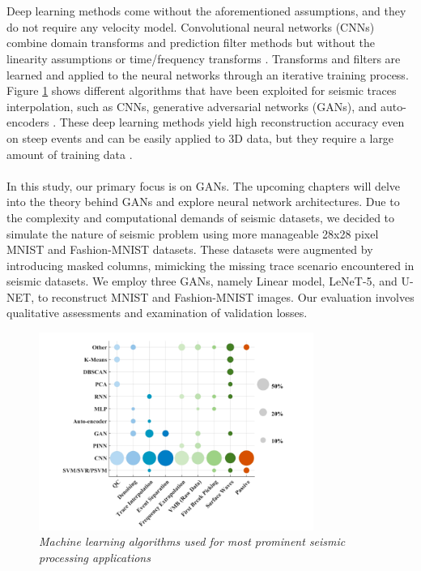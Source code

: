 \\\\
Deep learning methods come without the aforementioned assumptions, and they do not require any velocity model. Convolutional neural networks (CNNs) combine domain transforms and prediction filter methods but without the linearity assumptions or time/frequency transforms \cite{oliveira2018interpolating}. Transforms and filters are learned and applied to the neural networks through an iterative training process. Figure \ref{fig:methods} shows different algorithms that have been exploited for seismic traces interpolation, such as CNNs, generative adversarial networks (GANs), and auto-encoders \cite{khosro2023machine}. These deep learning methods yield high reconstruction accuracy even on steep events and can be easily applied to 3D data, but they require a large amount of training data \cite{kaur2019seismic, kaur2021seismic, khosro2023machine}.
\\\\
In this study, our primary focus is on GANs. The upcoming chapters will delve into the theory behind GANs and explore neural network architectures. Due to the complexity and computational demands of seismic datasets, we decided to simulate the nature of seismic problem using more manageable 28x28 pixel MNIST and Fashion-MNIST datasets. These datasets were augmented by introducing masked columns, mimicking the missing trace scenario encountered in seismic datasets. We employ three GANs, namely Linear model, LeNeT-5, and U-NET, to reconstruct MNIST and Fashion-MNIST images. Our evaluation involves qualitative assessments and examination of validation losses.

\begin{figure}[H]
    \centering
    \includegraphics[width=0.8\textwidth]{Figure/Front_page/methods.png}
    \caption{\textit{Machine learning algorithms used for most prominent seismic processing applications \cite{khosro2023machine}}}
    \label{fig:methods}
\end{figure}

